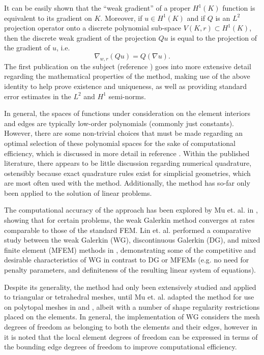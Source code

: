 \documentclass[11pt]{article} %
\begin{document}
It can be easily shown that the ``weak gradient'' of a proper $H^1 (K)$ function is equivalent to its gradient on $K$. Moreover, if $u \in H^1 (K)$ and if $Q$ is an $L^2$ projection operator onto a discrete polynomial sub-space $V( K, r ) \subset H^1 (K)$, then the discrete weak gradient of the projection $Qu$ is equal to the projection of the gradient of $u$, i.e.
\begin{equation}
	\nabla_{w,r} (Qu) = Q (\nabla u).
\end{equation}
The first publication on the subject (reference \cite{wg_elliptic}) goes into more extensive detail regarding the mathematical properties of the method, making use of the above identity to help prove existence and uniqueness, as well as providing standard error estimates in the $L^2$ and $H^1$ semi-norms.

In general, the spaces of functions under consideration on the element interiors and edges are typically low-order polynomials (commonly just constants). However, there are some non-trivial choices that must be made regarding an optimal selection of these polynomial spaces for the sake of computational efficiency, which is discussed in more detail in reference \cite{wg_polynomial_reduction}. Within the published literature, there appears to be little discussion regarding numerical quadrature, ostensibly because exact quadrature rules exist for simplicial geometries, which are most often used with the method. Additionally, the method has so-far only been applied to the solution of linear problems.

The computational accuracy of the approach has been explored by Mu et. al. in \cite{wg_computational_study}, showing that for certain problems, the weak Galerkin method converges at rates comparable to those of the standard FEM. Lin et. al. performed a comparative study between the weak Galerkin (WG), discontinuous Galerkin (DG), and mixed finite element (MFEM) methods in \cite{wg_comparative}, demonstrating some of the competitive and desirable characteristics of WG in contrast to DG or MFEMs (e.g. no need for penalty parameters, and definiteness of the resulting linear system of equations).

Despite its generality, the method had only been extensively studied and applied to triangular or tetrahedral meshes, until Mu et. al. adapted the method for use on polytopal meshes in \cite{wg_polytopal} and \cite{wg_polynomial_reduction}, albeit with a number of shape regularity restrictions placed on the elements. In general, the implementation of WG considers the mesh degrees of freedom as belonging to both the elements and their edges, however in \cite{wg_polynomial_reduction} it is noted that the local element degrees of freedom can be expressed in terms of the bounding edge degrees of freedom to improve computational efficiency.
\end{document}
